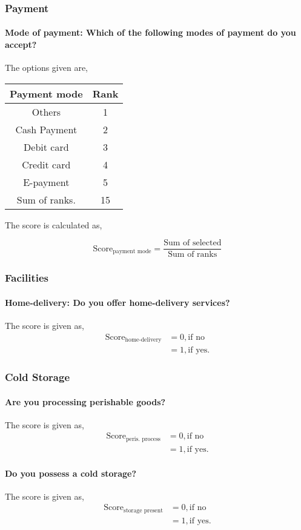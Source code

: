 \documentclass[oneside,twocolumn]{article}
\newcommand{\tsub}[2]{\text{#1}_{\text{#2}}}
\newcommand{\dsub}[2]{\dfrac{\text{#1}}{\text{#2}}}
\newcommand{\multsel}[1]
{
	\[
		\tsub{Score}{#1} = \dsub{Sum of selected}{Sum of ranks}
	\]
}
\newenvironment{ttable}
{
\begin{center}
\begin{tabular}{c|c}
\hline
}
{
\\ \hline
\end{tabular}
\end{center}
}
\begin{document}
\subsubsection{Payment}
\paragraph{Mode of payment: Which of the following modes of payment do you accept?}
The options given are,
\begin{ttable}
	Payment mode & Rank \\ \hline
	Others & 1 \\
	Cash Payment & 2 \\
	Debit card & 3 \\
	Credit card & 4 \\
	E-payment & 5 \\ \hline
	Sum of ranks. & 15
\end{ttable}
The score is calculated as,
\multsel{payment mode}
\subsubsection{Facilities}
\paragraph{Home-delivery: Do you offer home-delivery services?}
The score is given as,
\begin{align*}
	\tsub{Score}{home-delivery} &= 0, \text{if no} \\
	&= 1, \text{if yes}.
\end{align*}
\subsubsection{Cold Storage}
\paragraph{Are you processing perishable goods?}
The score is given as,
\begin{align*}
	\tsub{Score}{peris. process} &= 0, \text{if no} \\
	&= 1, \text{if yes}.
\end{align*}
\paragraph{Do you possess a cold storage?}
The score is given as,
\begin{align*}
	\tsub{Score}{storage present} &= 0, \text{if no} \\
	&= 1, \text{if yes}.
\end{align*}
\end{document}
